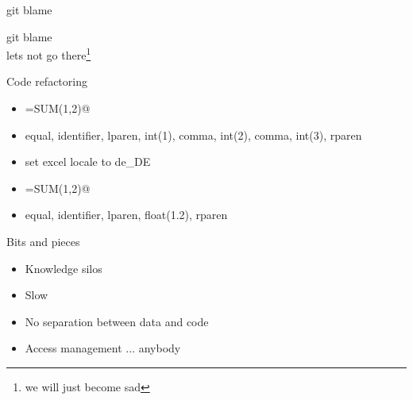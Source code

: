 \documentclass[aspectratio=169,notes]{beamer}
\begin{document}
	\begin{frame}[fragile]{git blame}
		\begin{center}
			\huge
			git blame\\[2cm]
			\pause
			\large
			lets not go there\footnote{we will just become sad}
		\end{center}
	\end{frame}

	\begin{frame}[fragile]{Code refactoring}
		\begin{itemize}
			\item \lstinline@=SUM(1,2)@ \pause
			\item equal, identifier, lparen, int(1), comma, int(2), comma, int(3), rparen
			\item set excel locale to de\_DE
			\item \lstinline@=SUM(1,2)@ \pause
			\item equal, identifier, lparen, float(1.2), rparen
		\end{itemize}
	\end{frame}

	\begin{frame}[fragile]{Bits and pieces}
		\begin{itemize}
			\item Knowledge silos
			\item Slow	
			\item No separation between data and code
			\item Access management $\dots$ anybody
		\end{itemize}
	\end{frame}
\end{document}
